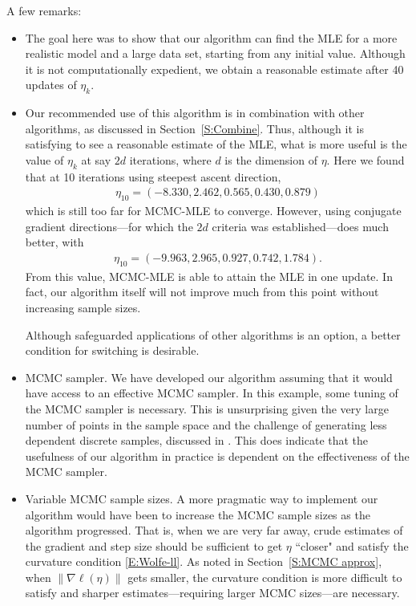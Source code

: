 A few remarks:
\begin{itemize}
\item The goal here was to show that our algorithm can find the MLE for a more realistic model and a large data set, starting from any initial value.
Although it is not computationally expedient, 
we obtain a reasonable estimate after 40 updates of $\eta_k$.  

\item Our recommended use of this algorithm is in combination with other algorithms,
as discussed in Section~\ref{S:Combine}.  Thus, although it is satisfying to see a reasonable estimate of the MLE, what is more useful is the value of $\eta_k$ 
at say $2d$ iterations, where $d$ is the dimension of $\eta$.  
Here we found that at 10 iterations using steepest ascent direction,
\begin{align*}
	\eta_{10} =( -8.330,  2.462,  0.565,  0.430,  0.879) 
\end{align*}
which is still too far for MCMC-MLE to converge.
However, using conjugate gradient directions---for which the $2d$ criteria was
established---does much better, with
\begin{align*}
	\eta_{10} =( -9.963,  2.965,  0.927,  0.742,  1.784).
\end{align*}
From this value, MCMC-MLE is able to attain the MLE in one update.  In fact,
our algorithm itself will not improve much from this point without increasing sample
sizes.

Although safeguarded applications of other algorithms is an option, a better condition
for switching is desirable.

\item MCMC sampler.  We have developed our algorithm assuming that it would have access
to an effective MCMC sampler.  In this example, some tuning of the MCMC
sampler is necessary.  
This is unsurprising given the very large number of points in the sample space 
and the challenge of generating less dependent discrete samples, discussed 
in \citep{ergm,Morris:2008}.
This does indicate that the usefulness of our algorithm in practice is dependent on the 
effectiveness of the MCMC sampler.

\item Variable MCMC sample sizes.  A more pragmatic way to implement our 
algorithm would have
been to increase the MCMC sample sizes as the algorithm progressed.  That is, when
we are very far away, crude estimates of the gradient and step size should be sufficient
to get $\eta$ ``closer" and satisfy the curvature condition \eqref{E:Wolfe-ll}.
As noted in Section~\ref{S:MCMC approx}, when $\lVert \nabla \ell(\eta) \rVert$ gets
smaller, the curvature condition is more difficult to satisfy and sharper estimates---requiring larger MCMC sizes---are necessary.
\end{itemize}


